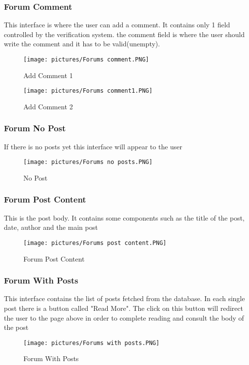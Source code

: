 \documentclass[12pt]{report}
\begin{document}
\subsubsection{Forum Comment}
This interface is where the user can add a comment. It contains only 1 field controlled by the verification system.
the comment field is where the user should write the comment and it has to be valid(unempty). 


\begin{figure}[!htbp]
    \centering
    \texttt{[image: pictures/Forums comment.PNG]}
    \caption{Add Comment 1}
    \label{fig:14}
\end{figure}
\begin{figure}[!htbp]
    \centering
    \texttt{[image: pictures/Forums comment1.PNG]}
    \caption{Add Comment 2}
    \label{fig:14}
\end{figure}
\pagebreak
\subsubsection{Forum No Post}
If there is no posts yet this interface will appear to the user
\begin{figure}[!htbp]
    \centering
    \texttt{[image: pictures/Forums no posts.PNG]}
    \caption{No Post}
    \label{fig:14}
\end{figure}
\pagebreak
\subsubsection{Forum Post Content}
This is the post body. It contains some components such as the title of the post, date, author and the main post
\begin{figure}[!htbp]
    \centering
    \texttt{[image: pictures/Forums post content.PNG]}
    \caption{Forum Post Content}
    \label{fig:14}
\end{figure}
\subsubsection{Forum With Posts}
This interface contains the list of posts fetched from the database. In each single post there is a button called "Read More". The click on this button will redirect the user to the page above in order to complete reading and consult the body of the post
\begin{figure}[!htbp]
    \centering
    \texttt{[image: pictures/Forums with posts.PNG]}
    \caption{Forum With Posts}
    \label{fig:14}
\end{figure}
\end{document}
